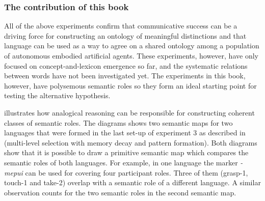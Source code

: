 \subsubsection{The contribution of this book}
All of the above experiments confirm that communicative success can be a driving force for constructing an ontology of meaningful distinctions and that language can be used as a way to agree on a shared ontology among a population of autonomous embodied artificial agents. These experiments, however, have only focused on concept-and-lexicon emergence so far, and the systematic relations between words have not been investigated yet. The experiments in this book, however, have polysemous semantic roles so they form an ideal starting point for testing the alternative hypothesis.

 illustrates how analogical reasoning can be responsible for constructing coherent classes of semantic roles. The diagrams shows two semantic maps for two languages that were formed in the last set-up of experiment 3 as described in  (multi-level selection with memory decay and pattern formation). Both diagrams show that it is possible to draw a primitive semantic map which compares the semantic roles of both languages. For example, in one language the marker {\em -mepui} can be used for covering four participant roles. Three of them (grasp-1, touch-1 and take-2) overlap with a semantic role of a different language. A similar observation counts for the two semantic roles in the second semantic map.

